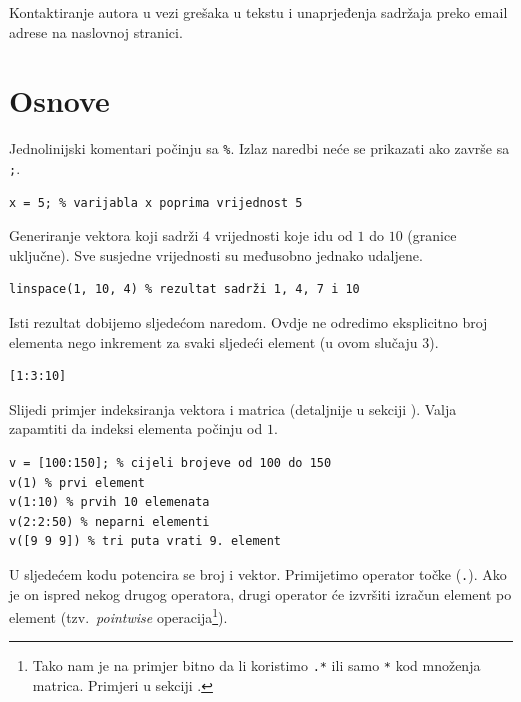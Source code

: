 \documentclass[a4paper, 10pt]{article}
\begin{document}
Kontaktiranje autora u vezi grešaka u tekstu i unaprjeđenja sadržaja preko email adrese na naslovnoj stranici.

\clearpage


\section{Osnove}

Jednolinijski komentari počinju sa \texttt{\%}.
Izlaz naredbi neće se prikazati ako završe sa \texttt{;}.

\begin{lstlisting}
x = 5; % varijabla x poprima vrijednost 5
\end{lstlisting}

Generiranje vektora koji sadrži $4$ vrijednosti koje idu od $1$ do $10$ (granice uključne).
Sve susjedne vrijednosti su međusobno jednako udaljene.

\begin{lstlisting}
linspace(1, 10, 4) % rezultat sadrži 1, 4, 7 i 10
\end{lstlisting}

Isti rezultat dobijemo sljedećom naredom.
Ovdje ne odredimo eksplicitno broj elementa nego inkrement za svaki sljedeći element (u ovom slučaju $3$).

\begin{lstlisting}
[1:3:10]
\end{lstlisting}

Slijedi primjer indeksiranja vektora i matrica (detaljnije u sekciji ).
Valja zapamtiti da indeksi elementa počinju od $1$.

\begin{lstlisting}
v = [100:150]; % cijeli brojeve od 100 do 150
v(1) % prvi element
v(1:10) % prvih 10 elemenata
v(2:2:50) % neparni elementi
v([9 9 9]) % tri puta vrati 9. element
\end{lstlisting}

U sljedećem kodu potencira se broj i vektor. Primijetimo operator točke (\texttt{.}).
Ako je on ispred nekog drugog operatora, drugi operator će izvršiti izračun element po element (tzv.\ \emph{pointwise} operacija\footnote{Tako nam je na primjer bitno da li koristimo \texttt{.*} ili samo \texttt{*} kod množenja matrica.
Primjeri u sekciji .}).
\end{document}
